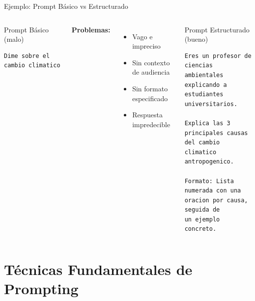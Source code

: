 \documentclass[aspectratio=169]{beamer}
\begin{document}
\begin{frame}[fragile]{Ejemplo: Prompt Básico vs Estructurado}
    \begin{columns}
        \begin{block}{Prompt Básico (malo)}
\begin{lstlisting}[style=promptstyle]
Dime sobre el cambio climatico
\end{lstlisting}
        \end{block}
        
        \textbf{Problemas:}
        \begin{itemize}
            \item Vago e impreciso
            \item Sin contexto de audiencia
            \item Sin formato especificado
            \item Respuesta impredecible
        \end{itemize}
        
        \begin{block}{Prompt Estructurado (bueno)}
\begin{lstlisting}[style=promptstyle]
Eres un profesor de ciencias 
ambientales explicando a 
estudiantes universitarios.

Explica las 3 principales causas
del cambio climatico antropogenico.

Formato: Lista numerada con una
oracion por causa, seguida de
un ejemplo concreto.
\end{lstlisting}
        \end{block}
    \end{columns}
\end{frame}

\section{Técnicas Fundamentales de Prompting}
\end{document}

